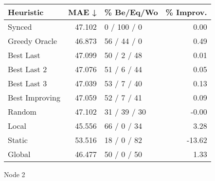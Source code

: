 \begin{tabular}{lrlr}
\toprule
\textbf{Heuristic} & \textbf{MAE ↓} & \textbf{\% Be/Eq/Wo} & \textbf{\% Improv.} \\
\midrule
            Synced &         47.102 &          0 / 100 / 0 &                0.00 \\
     Greedy Oracle &         46.873 &          56 / 44 / 0 &                0.49 \\
         Best Last &         47.099 &          50 / 2 / 48 &                0.01 \\
       Best Last 2 &         47.076 &          51 / 6 / 44 &                0.05 \\
       Best Last 3 &         47.039 &          53 / 7 / 40 &                0.13 \\
    Best Improving &         47.059 &          52 / 7 / 41 &                0.09 \\
            Random &         47.102 &         31 / 39 / 30 &               -0.00 \\
             Local &         45.556 &          66 / 0 / 34 &                3.28 \\
            Static &         53.516 &          18 / 0 / 82 &              -13.62 \\
            Global &         46.477 &          50 / 0 / 50 &                1.33 \\
\bottomrule
\end{tabular}
\caption{Node 2}
\label{tab:non_lr01_le1_bs2_2}
